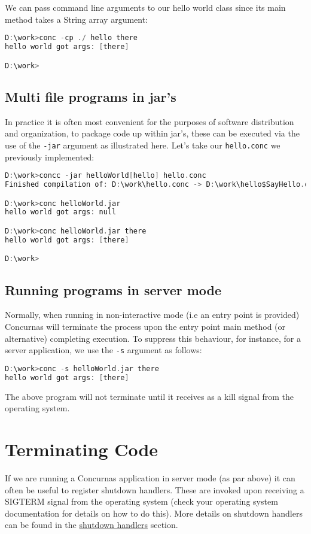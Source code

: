 \documentclass[conc-doc]{subfiles}
\begin{document}
We can pass command line arguments to our hello world class since its main method takes a String array argument:
\begin{lstlisting}[language=C]
D:\work>conc -cp ./ hello there
hello world got args: [there]

D:\work>
\end{lstlisting}


\subsection{Multi file programs in jar's}
In practice it is often most convenient for the purposes of software distribution and organization, to package code up within jar's, these can be executed via the use of the \lstinline{-jar} argument as illustrated here. Let's take our \lstinline{hello.conc} we previously implemented:

\begin{lstlisting}[language=C]
D:\work>concc -jar helloWorld[hello] hello.conc
Finished compilation of: D:\work\hello.conc -> D:\work\hello$SayHello.class [hello$SayHello], D:\work\hello.class [hello]

D:\work>conc helloWorld.jar
hello world got args: null

D:\work>conc helloWorld.jar there
hello world got args: [there]

D:\work>
\end{lstlisting}


\subsection{Running programs in server mode}
Normally, when running in non-interactive mode (i.e an entry point is provided) Concurnas will terminate the process upon the entry point main method (or alternative) completing execution. To suppress this behaviour, for instance, for a server application, we use the  \lstinline{-s} argument as follows:

\begin{lstlisting}[language=C]
D:\work>conc -s helloWorld.jar there
hello world got args: [there]


\end{lstlisting}

The above program will not terminate until it receives as a kill signal from the operating system.

\section{Terminating Code}
If we are running a Concurnas application in server mode (as par above) it can often be useful to register shutdown handlers. These are invoked upon receiving a SIGTERM signal from the operating system (check your operating system documentation for details on how to do this). More details on shutdown handlers can be found in the \hyperref[sec:shutdownHandle]{shutdown handlers} section. 
\end{document}
